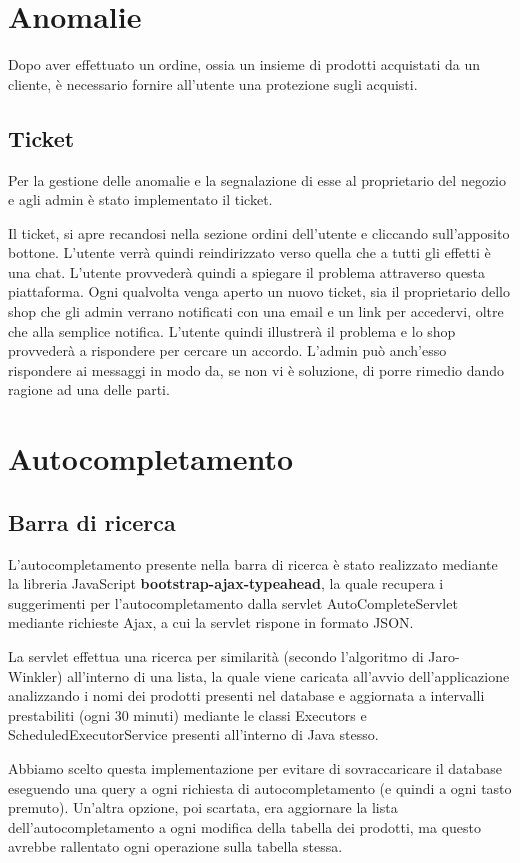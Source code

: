 \chapter{Anomalie}
Dopo aver effettuato un ordine, ossia un insieme di prodotti acquistati da un cliente, è necessario fornire all'utente una protezione sugli acquisti.

\section{Ticket}
Per la gestione delle anomalie e la segnalazione di esse al proprietario del negozio e agli admin è stato implementato il ticket.

Il ticket, si apre recandosi nella sezione ordini dell'utente e cliccando sull'apposito bottone.
L'utente verrà quindi reindirizzato verso quella che a tutti gli effetti è una chat.
L'utente provvederà quindi a spiegare il problema attraverso questa piattaforma. Ogni qualvolta venga aperto un nuovo ticket, sia il proprietario dello shop che gli admin verrano notificati con una email e un link per accedervi, oltre che alla semplice notifica. L'utente quindi illustrerà il problema e lo shop provvederà a rispondere per cercare un accordo. L'admin può anch'esso rispondere ai messaggi in modo da, se non vi è soluzione, di porre rimedio dando ragione ad una delle parti.


\chapter{Autocompletamento}

\section{Barra di ricerca}
L'autocompletamento presente nella barra di ricerca è stato realizzato mediante la libreria JavaScript  \textbf{bootstrap-ajax-typeahead}, la quale recupera i suggerimenti per l'autocompletamento dalla servlet AutoCompleteServlet mediante richieste Ajax, a cui la servlet rispone in formato JSON.

La servlet effettua una ricerca per similarità (secondo l'algoritmo di Jaro-Winkler) all'interno di una lista, la quale viene caricata all'avvio dell'applicazione analizzando i nomi dei prodotti presenti nel database e aggiornata a intervalli prestabiliti (ogni 30 minuti) mediante le classi Executors e ScheduledExecutorService presenti all'interno di Java stesso.

Abbiamo scelto questa implementazione per evitare di sovraccaricare il database eseguendo una query a ogni richiesta di autocompletamento (e quindi a ogni tasto premuto).
Un'altra opzione, poi scartata, era aggiornare la lista dell'autocompletamento a ogni modifica della tabella dei prodotti, ma questo avrebbe rallentato ogni operazione sulla tabella stessa.

